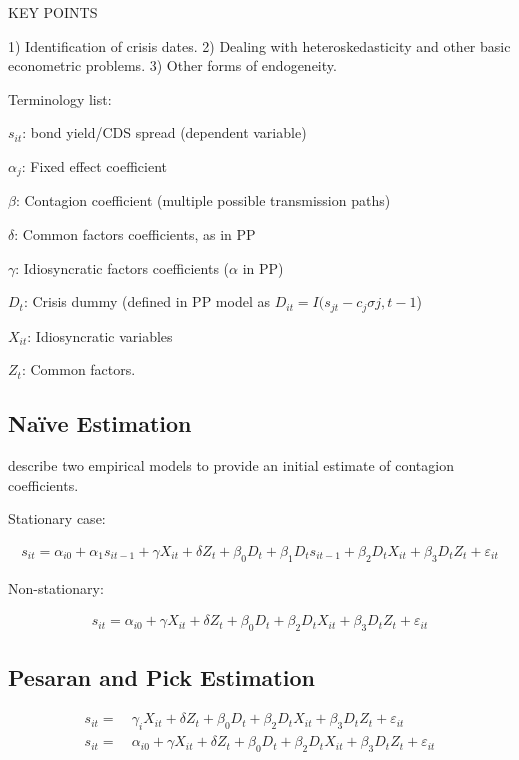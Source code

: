 \documentclass[../base.tex]{subfiles}
\begin{document}
KEY POINTS

1) Identification of crisis dates.
2) Dealing with heteroskedasticity and other basic econometric problems. 
3) Other forms of endogeneity. 


Terminology list:

$s_{it}$: bond yield/CDS spread (dependent variable)

$\alpha_j$: Fixed effect coefficient

$\beta$: Contagion coefficient (multiple possible transmission paths)

$\delta$: Common factors coefficients, as in PP

$\gamma$: Idiosyncratic factors coefficients ($\alpha$ in PP)

$D_t$: Crisis dummy (defined in PP model as $D_{it} = I(s_{jt} - c_j\sigma{j, t-1}$)

$X_{it}$: Idiosyncratic variables

$Z_t$: Common factors. 

\subsection{Na\"{i}ve Estimation}

\cite{giordano2013pure} describe two empirical models to provide an initial estimate of contagion coefficients. 

Stationary case:

\begin{align}
	s_{it} = \alpha_{i0} + \alpha_{1}s_{it-1} +\gamma X_{it} + \delta Z_t + \beta_0D_t + \beta_1D_ts_{it-1} + \beta_2D_tX_{it} + \beta_3D_tZ_t + \varepsilon_{it}
\end{align}

Non-stationary:

\begin{align}
	s_{it} = \alpha_{i0} + \gamma X_{it} + \delta Z_t + \beta_0D_t + \beta_2D_tX_{it} + \beta_3D_tZ_t + \varepsilon_{it}
\end{align}


\subsection{Pesaran and Pick Estimation}
\label{pp}

\begin{align}
	s_{it} =&~\gamma_i X_{it} + \delta Z_t + \beta_0D_t + \beta_2D_tX_{it} + \beta_3D_tZ_t + \varepsilon_{it} \\
	s_{it} =&~\alpha_{i0} + \gamma X_{it} + \delta Z_t + \beta_0D_t + \beta_2D_tX_{it} + \beta_3D_tZ_t + \varepsilon_{it} 
\end{align}
\end{document}
